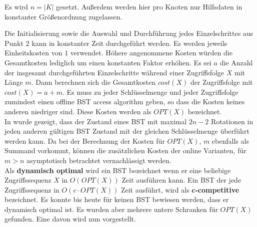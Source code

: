 \documentclass[a4paper,12pt]{article}
\begin{document}
 
 \noindent  Es wird $n = \vert K \vert$ gesetzt. Außerdem werden hier pro Knoten nur Hilfsdaten in konstanter Größenordnung zugelassen. 
 
 \noindent Die Initialisierung sowie die Auswahl und Durchführung jedes Einzelschrittes aus Punkt 2 kann in konstanter Zeit durchgeführt werden. Es werden jeweils Einheitskosten von $1$ verwendet. Höhere angenommene Kosten würden die Gesamtkosten lediglich um einen konstanten Faktor erhöhen. Es sei $a$ die Anzahl der insgesamt durchgeführten Einzelschritte während einer Zugriffsfolge $X$ mit Länge $m$. Dann berechnen sich die Gesamtkosten $\mathit{cost(X)}$ der Zugriffsfolge mit $\mathit{cost(X)} = a + m$. Es muss zu jeder Schlüsselmenge und jeder Zugriffsfolge zumindest einen offline BST access algorithm geben, so dass die Kosten keines anderen niedriger sind. Diese Kosten werden als $\mathit{OPT}\left(X\right)$ bezeichnet.\\  In \cite{nRotations} wurde gezeigt, dass der Zustand eines BST mit maximal $2n -2$ Rotationen in jeden anderen gültigen BST Zustand mit der gleichen Schlüsselmenge überführt werden kann. Da bei der Berechnung der Kosten für  $\mathit{OPT(X)}$, $m$ ebenfalls als Summand vorkommt, können die zusätzlichen Kosten der online Varianten, für $m > n$ asymptotisch betrachtet vernachlässigt werden. \\
 \noindent Als \textbf{dynamisch optimal } wird ein BST bezeichnet wenn er eine beliebige Zugriffssequenz $X$ in $O\left(\mathit{OPT}\left(X\right)\right)$ Zeit ausführen kann. Ein BST der jede Zugriffssequenz in $O\left(c \cdot \mathit{OPT}\left(X\right)\right)$ Zeit ausführt, wird als \textbf{c-competitive} bezeichnet. Es konnte bis heute für keinen BST bewiesen werden, dass er dynamisch optimal ist. Es wurden aber mehrere untere Schranken für $\mathit{OPT}\left(X\right)$ gefunden. Eine davon wird  nun vorgestellt.
\end{document}
